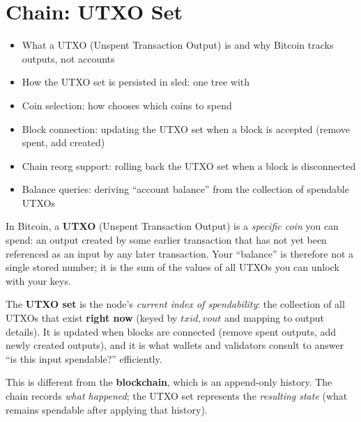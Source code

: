 \chapter{Chain: UTXO Set}
\label{ch:utxo-set}

\begin{learnbox}
\begin{itemize}
  \item What a UTXO (Unspent Transaction Output) is and why Bitcoin tracks outputs, not accounts
  \item How the UTXO set is persisted in sled: one tree with 
  \item Coin selection: how  chooses which coins to spend
  \item Block connection: updating the UTXO set when a block is accepted (remove spent, add created)
  \item Chain reorg support: rolling back the UTXO set when a block is disconnected
  \item Balance queries: deriving ``account balance'' from the collection of spendable UTXOs
\end{itemize}
\end{learnbox}

In Bitcoin, a \textbf{UTXO} (Unspent Transaction Output) is a \emph{specific coin} you can spend: an output created by some earlier transaction that has not yet been referenced as an input by any later transaction. Your ``balance'' is therefore not a single stored number; it is the sum of the values of all UTXOs you can unlock with your keys.

The \textbf{UTXO set} is the node's \emph{current index of spendability}: the collection of all UTXOs that exist \textbf{right now} (keyed by \(txid, vout\) and mapping to output details). It is updated when blocks are connected (remove spent outputs, add newly created outputs), and it is what wallets and validators consult to answer ``is this input spendable?'' efficiently.

This is different from the \textbf{blockchain}, which is an append-only history. The chain records \emph{what happened}; the UTXO set represents the \emph{resulting state} (what remains spendable after applying that history).

